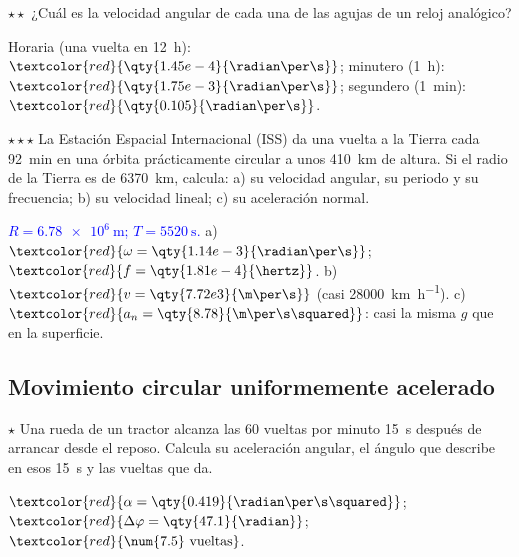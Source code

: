 \begin{exercise}
    \(\star\star\) ¿Cuál es la velocidad angular de cada una de las agujas de un reloj analógico?
    \begin{solu}
        Horaria (una vuelta en \qty{12}{\hour}): \(\textcolor{red}{\qty{1.45e-4}{\radian\per\s}}\); minutero (\qty{1}{\hour}):
        \(\textcolor{red}{\qty{1.75e-3}{\radian\per\s}}\); segundero (\qty{1}{\minute}): \(\textcolor{red}{\qty{0.105}{\radian\per\s}}\).
    \end{solu}
\end{exercise}

\begin{exercise}
    \(\star\star\star\) La Estación Espacial Internacional (ISS) da una vuelta a la Tierra cada \qty{92}{\minute} en una órbita
    prácticamente circular a unos \qty{410}{\km} de altura. Si el radio de la Tierra es de \qty{6370}{\km}, calcula: a) su velocidad
    angular, su periodo y su frecuencia; b) su velocidad lineal; c) su aceleración normal.
    \begin{solu}
        \textcolor{blue}{\(R = \qty{6.78e6}{\m}\); \(T = \qty{5520}{\s}\).} a) \(\textcolor{red}{\omega = \qty{1.14e-3}{\radian\per\s}}\);
        \(\textcolor{red}{f = \qty{1.81e-4}{\hertz}}\). b) \(\textcolor{red}{v = \qty{7.72e3}{\m\per\s}}\) (casi \qty{28000}{\km\per\hour}).
        c) \(\textcolor{red}{a_n = \qty{8.78}{\m\per\s\squared}}\): casi la misma \(g\) que en la superficie.
    \end{solu}
\end{exercise}

\subsection{Movimiento circular uniformemente acelerado}

\begin{exercise}
    \(\star\) Una rueda de un tractor alcanza las 60 vueltas por minuto \qty{15}{\s} después de arrancar desde el reposo. Calcula su
    aceleración angular, el ángulo que describe en esos \qty{15}{\s} y las vueltas que da.
    \begin{solu}
        \(\textcolor{red}{\alpha = \qty{0.419}{\radian\per\s\squared}}\); \(\textcolor{red}{\Delta\varphi = \qty{47.1}{\radian}}\);
        \(\textcolor{red}{\num{7.5}~\text{vueltas}}\).
    \end{solu}
\end{exercise}

